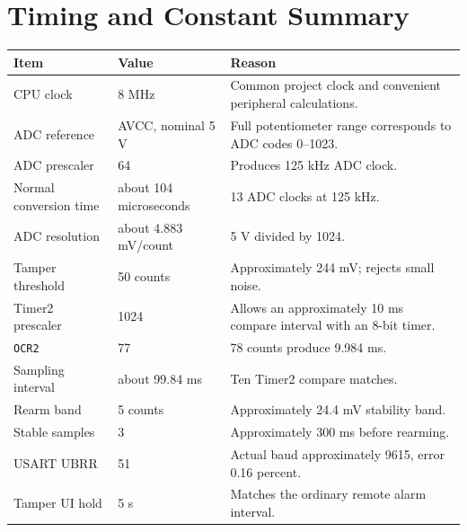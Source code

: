 \documentclass[11pt,a4paper]{article}
\begin{document}
\section{Timing and Constant Summary}
\begin{longtable}{p{}p{}p{}}
\toprule
Item & Value & Reason \\
\midrule
\endhead
CPU clock & 8 MHz & Common project clock and convenient peripheral calculations. \\
ADC reference & AVCC, nominal 5 V & Full potentiometer range corresponds to ADC codes 0--1023. \\
ADC prescaler & 64 & Produces 125 kHz ADC clock. \\
Normal conversion time & about 104 microseconds & 13 ADC clocks at 125 kHz. \\
ADC resolution & about 4.883 mV/count & 5 V divided by 1024. \\
Tamper threshold & 50 counts & Approximately 244 mV; rejects small noise. \\
Timer2 prescaler & 1024 & Allows an approximately 10 ms compare interval with an 8-bit timer. \\
\texttt{OCR2} & 77 & 78 counts produce 9.984 ms. \\
Sampling interval & about 99.84 ms & Ten Timer2 compare matches. \\
Rearm band & 5 counts & Approximately 24.4 mV stability band. \\
Stable samples & 3 & Approximately 300 ms before rearming. \\
USART UBRR & 51 & Actual baud approximately 9615, error 0.16 percent. \\
Tamper UI hold & 5 s & Matches the ordinary remote alarm interval. \\
\bottomrule
\end{longtable}
\end{document}
